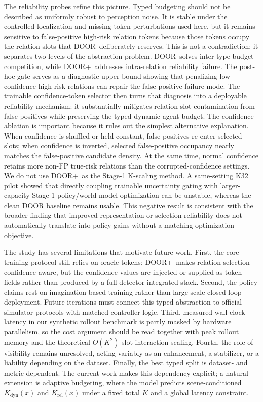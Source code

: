 \documentclass[10pt,journal,compsoc]{IEEEtran}
\newcommand{\method}{\textsc{DOOR}}
\newcommand{\doorplus}{\textsc{DOOR+}}
\begin{document}
The reliability probes refine this picture. Typed budgeting should not be described as uniformly robust to perception noise. It is stable under the controlled localization and missing-token perturbations used here, but it remains sensitive to false-positive high-risk relation tokens because those tokens occupy the relation slots that \method\ deliberately reserves. This is not a contradiction; it separates two levels of the abstraction problem. \method\ solves inter-type budget competition, while \doorplus\ addresses intra-relation reliability failure. The post-hoc gate serves as a diagnostic upper bound showing that penalizing low-confidence high-risk relations can repair the false-positive failure mode. The trainable confidence-token selector then turns that diagnosis into a deployable reliability mechanism: it substantially mitigates relation-slot contamination from false positives while preserving the typed dynamic-agent budget. The confidence ablation is important because it rules out the simplest alternative explanation. When confidence is shuffled or held constant, false positives re-enter selected slots; when confidence is inverted, selected false-positive occupancy nearly matches the false-positive candidate density. At the same time, normal confidence retains more non-FP true-risk relations than the corrupted-confidence settings. We do not use \doorplus\ as the Stage-1 K-scaling method. A same-setting K32 pilot showed that directly coupling trainable uncertainty gating with larger-capacity Stage-1 policy/world-model optimization can be unstable, whereas the clean DOOR baseline remains usable. This negative result is consistent with the broader finding that improved representation or selection reliability does not automatically translate into policy gains without a matching optimization objective.

The study has several limitations that motivate future work. First, the core training protocol still relies on oracle tokens; \doorplus\ makes relation selection confidence-aware, but the confidence values are injected or supplied as token fields rather than produced by a full detector-integrated stack. Second, the policy claims rest on imagination-based training rather than large-scale closed-loop deployment. Future iterations must connect this typed abstraction to official simulator protocols with matched controller logic. Third, measured wall-clock latency in our synthetic rollout benchmark is partly masked by hardware parallelism, so the cost argument should be read together with peak rollout memory and the theoretical $O(K^2)$ slot-interaction scaling. Fourth, the role of visibility remains unresolved, acting variably as an enhancement, a stabilizer, or a liability depending on the dataset. Finally, the best typed split is dataset- and metric-dependent. The current work makes this dependency explicit; a natural extension is adaptive budgeting, where the model predicts scene-conditioned $K_{\mathrm{dyn}}(x)$ and $K_{\mathrm{rel}}(x)$ under a fixed total $K$ and a global latency constraint.
\end{document}
